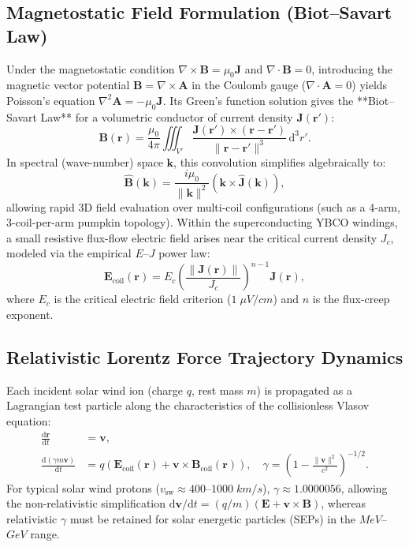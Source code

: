 \documentclass[11pt,a4paper]{article}
\newcommand{\vect}[1]{\bm{#1}}
\newcommand{\dd}{\mathrm{d}}
\begin{document}
\subsection{Magnetostatic Field Formulation (Biot--Savart Law)}
Under the magnetostatic condition $\nabla \times \vect{B} = \mu_0 \vect{J}$ and $\nabla \cdot \vect{B} = 0$, introducing the magnetic vector potential $\vect{B} = \nabla \times \vect{A}$ in the Coulomb gauge ($\nabla \cdot \vect{A} = 0$) yields Poisson's equation $\nabla^2 \vect{A} = -\mu_0 \vect{J}$. Its Green's function solution gives the **Biot--Savart Law** for a volumetric conductor of current density $\vect{J}(\vect{r}')$:
\begin{equation}
    \vect{B}(\vect{r}) = \frac{\mu_0}{4\pi} \iiint_{V'} \frac{\vect{J}(\vect{r}') \times (\vect{r} - \vect{r}')}{\|\vect{r} - \vect{r}'\|^3} \, \dd^3 r'.
    \label{eq:biot_savart_3d}
\end{equation}
In spectral (wave-number) space $\vect{k}$, this convolution simplifies algebraically to:
\begin{equation}
    \hat{\vect{B}}(\vect{k}) = \frac{i \mu_0}{\|\vect{k}\|^2} \left( \vect{k} \times \hat{\vect{J}}(\vect{k}) \right),
\end{equation}
allowing rapid 3D field evaluation over multi-coil configurations (such as a 4-arm, 3-coil-per-arm pumpkin topology). Within the superconducting YBCO windings, a small resistive flux-flow electric field arises near the critical current density $J_c$, modeled via the empirical $E\text{--}J$ power law:
\begin{equation}
    \vect{E}_{\text{coil}}(\vect{r}) = E_c \left( \frac{\|\vect{J}(\vect{r})\|}{J_c} \right)^{n-1} \vect{J}(\vect{r}),
\end{equation}
where $E_c$ is the critical electric field criterion ($1\;\si{\mu V/cm}$) and $n$ is the flux-creep exponent.

\subsection{Relativistic Lorentz Force Trajectory Dynamics}
Each incident solar wind ion (charge $q$, rest mass $m$) is propagated as a Lagrangian test particle along the characteristics of the collisionless Vlasov equation:
\begin{align}
    \frac{\dd \vect{r}}{\dd t} &= \vect{v}, \\
    \frac{\dd (\gamma m \vect{v})}{\dd t} &= q \left( \vect{E}_{\text{coil}}(\vect{r}) + \vect{v} \times \vect{B}_{\text{coil}}(\vect{r}) \right), \quad \gamma = \left(1 - \frac{\|\vect{v}\|^2}{c^2}\right)^{-1/2}.
    \label{eq:lorentz_ode}
\end{align}
For typical solar wind protons ($v_{\text{sw}} \approx 400\text{--}1000\;\si{km/s}$), $\gamma \approx 1.0000056$, allowing the non-relativistic simplification $\dd \vect{v}/\dd t = (q/m)(\vect{E} + \vect{v} \times \vect{B})$, whereas relativistic $\gamma$ must be retained for solar energetic particles (SEPs) in the $\si{MeV}$--$\si{GeV}$ range.
\end{document}
